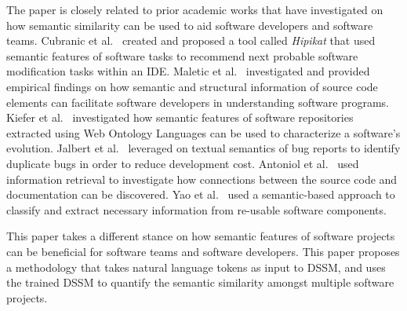 \documentclass[conference]{IEEEtran}
\begin{document}



The paper is closely related to prior academic works that have investigated on how semantic similarity can be used to aid software developers and software teams. Cubranic et al.~\cite{Cubranic:hipikat:related} created and proposed a tool called \textit{Hipikat} that used semantic features of software tasks to recommend next probable software modification tasks within an IDE. Maletic et al.~\cite{Maletic:simila:rel} investigated and provided empirical findings on how semantic and structural information of source code elements can facilitate software developers in understanding software programs. Kiefer et al.~\cite{Kiefer:ontlogy:rel} investigated how semantic features of software repositories extracted using Web Ontology Languages can be used to characterize a software's evolution. Jalbert et al.~\cite{jalbert:bug:related} leveraged on textual semantics of bug reports to identify duplicate bugs in order to reduce development cost. Antoniol et al.~\cite{antoniol:link:related} used information retrieval to investigate how connections between the source code and documentation can be discovered. Yao et al.~\cite{Yao:reuse:related} used a semantic-based approach to classify and extract necessary information from re-usable software components.        
    
This paper takes a different stance on how semantic features of software projects can be beneficial for software teams and software developers. This paper proposes a methodology that takes natural language tokens as input to DSSM, and uses the trained DSSM to quantify the semantic similarity amongst multiple software projects.                



\end{document}
